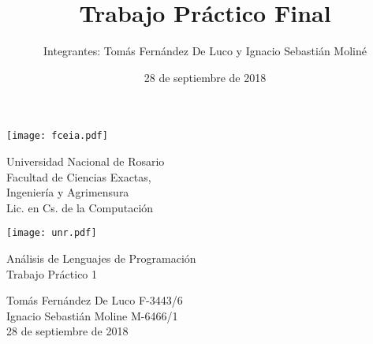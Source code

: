 \documentclass{article}
\title{Trabajo Práctico Final}
\author{Integrantes: Tomás Fernández De Luco y Ignacio Sebastián Moliné}
\date{28 de septiembre de 2018}
\begin{document}
\begin{titlepage}

\begin{minipage}{2.6cm}
\texttt{[image: fceia.pdf]}
\end{minipage}
\hfill
%
\begin{minipage}{6cm}
\begin{center}
\normalsize{Universidad Nacional de Rosario\\
Facultad de Ciencias Exactas,\\
Ingeniería y Agrimensura\\}
\vspace{0.5cm}
\large
Lic. en Cs. de la Computación
\end{center}
\end{minipage}
\hspace{0.5cm}
\hfill
\begin{minipage}{2.6cm}
\texttt{[image: unr.pdf]}
\end{minipage}

\vspace{5.5cm}

\begin{center}
\LARGE{\sc Análisis de Lenguajes de Programación}\\
\vspace{0.5cm}
\large{Trabajo Práctico 1}\\

\vspace{5cm}

\large
Tomás Fernández De Luco F-3443/6\\
Ignacio Sebastián Moline M-6466/1\\

\vspace*{0.5cm}
\small{28 de septiembre de 2018}

\makeatletter
\def\@seccntformat#1{%
  \expandafter\ifx\csname c@#1\endcsname\c@section\else
  \csname the#1\endcsname\quad
  \fi}
\makeatother



\end{center}
\end{titlepage}
\lstset{basicstyle=\small,style=myCustom}
	\newpage
	
\end{document}
